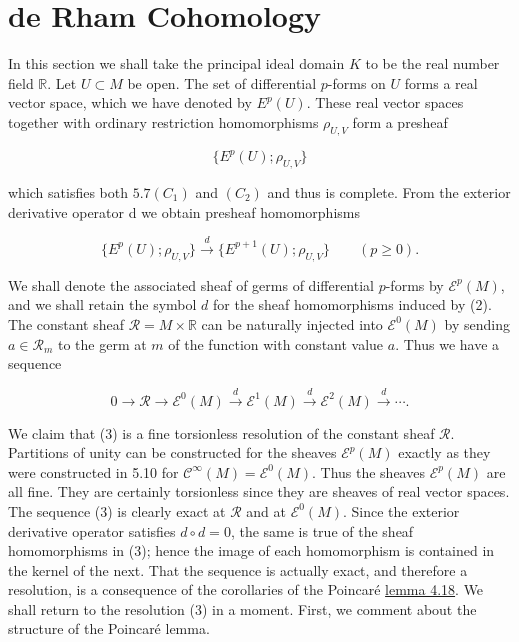 \section{de Rham Cohomology}


\label{thm:5.28} In this section we shall take the principal ideal domain $K$ to be the real number field $\mathbb{R}$. Let $U \subset M$ be open. The set of differential $p$-forms on $U$ forms a real vector space, which we have denoted by $E^p(U)$. These real vector spaces together with ordinary restriction homomorphisms $\rho_{U,V}$ form a presheaf

\begin{equation}
\tag{1}\label{eq:5.28:1}
\{E^{p}(U);\rho_{U,V}\}
\end{equation}

which satisfies both  $ 5.7(C_{1}) $ and  $ (C_{2}) $ and thus is complete. From the exterior derivative operator d we obtain presheaf homomorphisms

\begin{equation}
\tag{2}\label{eq:5.28:2}
\{E^{p}(U);\rho_{U,V}\}\xrightarrow{d}\{E^{p+1}(U);\rho_{U,V}\}\qquad(p\geq0).
\end{equation}

We shall denote the associated sheaf of germs of differential $p$-forms by $\mathcal{E}^{p}(M)$, and we shall retain the symbol $d$ for the sheaf homomorphisms induced by (2). The constant sheaf $\mathcal{R}=M\times\mathbb{R}$ can be naturally injected into $\mathcal{E}^{0}(M)$ by sending $a\in\mathcal{R}_{m}$ to the germ at $m$ of the function with constant value $a$. Thus we have a sequence

\begin{equation}
\tag{3}\label{eq:5.28:3}
0\to\mathcal{R}\to\mathcal{E}^{0}(M)\xrightarrow{d}\mathcal{E}^{1}(M)\xrightarrow{d}\mathcal{E}^{2}(M)\xrightarrow{d}\cdots.
\end{equation}

We claim that (3) is a fine torsionless resolution of the constant sheaf  $ \mathcal{R} $. Partitions of unity can be constructed for the sheaves  $ \mathcal{E}^{p}(M) $ exactly as they were constructed in 5.10 for  $ \mathcal{C}^{\infty}(M) = \mathcal{E}^{0}(M) $. Thus the sheaves  $ \mathcal{E}^{p}(M) $ are all fine. They are certainly torsionless since they are sheaves of real vector spaces. The sequence (3) is clearly exact at  $ \mathcal{R} $ and at  $ \mathcal{E}^{0}(M) $. Since the exterior derivative operator satisfies  $ d \circ d = 0 $, the same is true of the sheaf homomorphisms in (3); hence the image of each homomorphism is contained in the kernel of the next. That the sequence is actually exact, and therefore a resolution, is a consequence of the corollaries of the Poincaré \hyperref[thm:4.18]{lemma 4.18}. We shall return to the resolution (3) in a moment. First, we comment about the structure of the Poincaré lemma.

